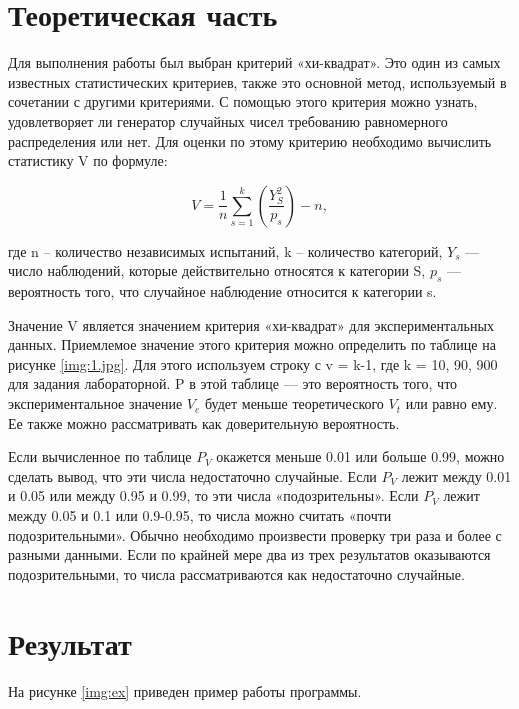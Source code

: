 \documentclass[a4paper, 14pt, unknownkeysallowed]{extreport}
\begin{document}

\setcounter{page}{2}

\chapter{Теоретическая часть}
Для выполнения работы был выбран критерий «хи-квадрат». Это один из самых известных статистических критериев,  также это основной метод, используемый в сочетании с другими критериями. 
С помощью этого критерия можно узнать, удовлетворяет ли генератор случайных чисел требованию равномерного распределения или нет. 
Для оценки по этому критерию необходимо вычислить статистику V по формуле:

\begin{equation}
	\label{ass}
	V = \frac{1}{n}\sum_{s=1}^{k}(\frac{Y^{2}_S}{p_s}) - n,
\end{equation} 

где n – количество независимых испытаний, k – количество категорий, $Y_s$ — число наблюдений, которые действительно относятся к категории S,  $p_s$ — вероятность того, что случайное наблюдение относится к категории s.  

Значение V является значением критерия «хи-квадрат» для экспериментальных данных. Приемлемое значение этого критерия можно определить по таблице на рисунке \ref{img:1.jpg}. Для этого используем строку с v = k-1, где k = 10, 90, 900 для задания лабораторной.  P в этой таблице — это вероятность того, что экспериментальное значение $V_e$ будет меньше теоретического $V_t$ или равно ему. Ее также можно рассматривать как доверительную вероятность.

Если вычисленное по таблице $P_V$ окажется меньше 0.01 или больше 0.99, можно сделать вывод, что эти числа недостаточно случайные. Если $P_V$ лежит между 0.01 и 0.05 или между 0.95 и 0.99, то эти числа «подозрительны». Если $P_V$ лежит между 0.05 и 0.1 или 0.9-0.95, то числа можно считать «почти подозрительными». Обычно необходимо произвести проверку три раза и более с разными данными. Если по крайней мере два из трех результатов оказываются подозрительными, то числа рассматриваются как недостаточно случайные.  


\chapter{Результат}
На рисунке \ref{img:ex} приведен пример работы программы.
\end{document}
